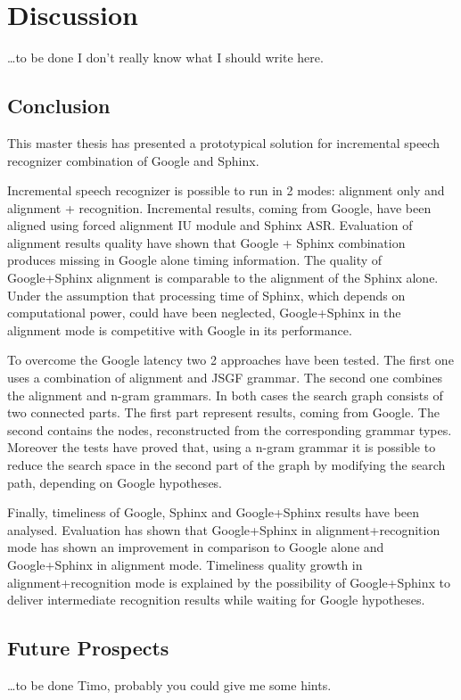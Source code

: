 \chapter{Discussion}

\ldots to be done 
I don't really know what I should write here.


\label{chap:concl}
\section {Conclusion}
This master thesis has presented a prototypical solution for incremental speech
recognizer combination of Google and Sphinx. 
% 

Incremental speech recognizer is possible to run in 2 modes: alignment only and
alignment + recognition. Incremental results, coming from Google, have been
aligned using forced alignment IU module and Sphinx ASR. Evaluation of
alignment  results quality have shown that Google + Sphinx combination produces
missing in Google alone timing information. The quality of Google+Sphinx
alignment is comparable to the alignment of the Sphinx alone. Under the
assumption that processing time of Sphinx, which depends on computational power,
could have been neglected, Google+Sphinx in the alignment mode is competitive
with Google in its performance. 

To overcome the Google latency two 2 approaches have been tested.  The first one
uses a combination of alignment and JSGF grammar. The second one combines the
alignment and n-gram grammars.  In both cases the search graph consists of two
connected parts. The first part  represent results, coming from Google.
The second contains the nodes, reconstructed from the
corresponding grammar types. Moreover the tests have proved that, using a n-gram
grammar it is possible to reduce the search space in the second part of the
graph by modifying the search path, depending on Google hypotheses. 

Finally, timeliness of Google, Sphinx and Google+Sphinx results have been
analysed. Evaluation has shown that Google+Sphinx in alignment+recognition mode
has shown an improvement in comparison to Google alone and Google+Sphinx in
alignment mode. Timeliness quality growth in alignment+recognition mode is
explained by the possibility of Google+Sphinx to deliver intermediate
recognition results while waiting for Google hypotheses. 

\section {Future Prospects}
\ldots to be done
Timo, probably you could give me some hints. 


